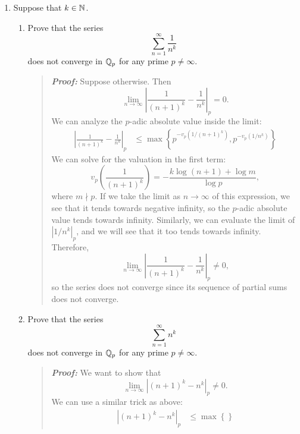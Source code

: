 \documentclass{hw}
\begin{document}
\begin{enumerate}
	\item Suppose that $k\in\mathbb{N}$.
	      \begin{enumerate}
	      	\item Prove that the series
	      	      \[
	      	      	\sum_{n=1}^{\infty}\frac{1}{n^{k}}
	      	      \]
	      	      does not converge in $\mathbb{Q}_{p}$ for any prime $p\neq\infty$.
				  \begin{quote}
					  \textit{\textbf{Proof:}} Suppose otherwise. Then
					  \[
					  	\lim_{n\to\infty}\left|%
							\frac{1}{(n+1)^{k}}-\frac{1}{n^{k}}%
						\right|_{p} = 0.
					  \]
					  We can analyze the $p$-adic absolute value inside the limit:
					  \begin{align*}
						  \left|\frac{1}{(n+1)^{k}}-\frac{1}{n^{k}}\right|_{p} &\leq
						  \max\left\{%
						  	p^{-v_{p}\left(1/(n+1)^{k}\right)}, p^{-v_{p}\left(1/n^{k}\right)}%
						  \right\}
					  \end{align*}
					  We can solve for the valuation in the first term:
					  \[
					  	v_{p}\left(
							\frac{1}{(n+1)^{k}}
						\right) =
						-\frac{
							k\log{(n+1)}+\log{m}
						}{
							\log{p}
						},
					  \]
					  where $m\nmid p$. If we take the limit as $n\to\infty$ of this expression, we see that it tends towards negative infinity, so the $p$-adic absolute value tends towards infinity. Similarly, we can evaluate the limit of $|1/n^{k}|_{p}$, and we will see that it too tends towards infinity. Therefore,
					  \[
					  	\lim_{n\to\infty}\left|%
							\frac{1}{(n+1)^{k}}-\frac{1}{n^{k}}%
						\right|_{p} \neq 0,
					  \]
					  so the series does not converge since its sequence of partial sums does not converge.
				  \end{quote}

	      	\item Prove that the series
	      	      \[
	      	      	\sum_{n=1}^{\infty}n^{k}
	      	      \]
	      	      does not converge in $\mathbb{Q}_{p}$ for any prime $p\neq\infty$.
				  \begin{quote}
					  \textit{\textbf{Proof:}} We want to show that
					  \[
					  	\lim_{n\to\infty}\left|(n+1)^{k} - n^{k}\right|_{p}\neq 0.
					  \]
					  We can use a similar trick as above:
					  \begin{align*}
						  \left|(n+1)^{k} - n^{k}\right|_{p} &\leq \max\left\{
						  	
						  \right\}
					  \end{align*}
				  \end{quote}
	      \end{enumerate}
\end{enumerate}
\end{document}
